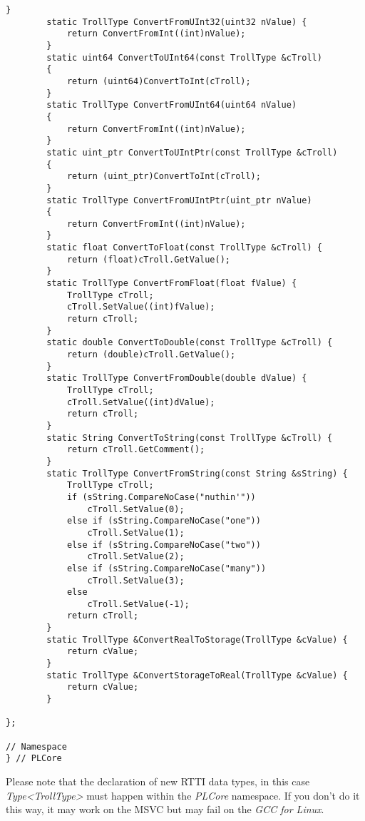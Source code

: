\begin{lstlisting}[label=Code:UserDefinedRTTIDataTypeInline,caption={Inline of the user defined \ac{RTTI} data type}]
		}
		static TrollType ConvertFromUInt32(uint32 nValue) {
			return ConvertFromInt((int)nValue);
		}
		static uint64 ConvertToUInt64(const TrollType &cTroll)
		{
			return (uint64)ConvertToInt(cTroll);
		}
		static TrollType ConvertFromUInt64(uint64 nValue)
		{
			return ConvertFromInt((int)nValue);
		}
		static uint_ptr ConvertToUIntPtr(const TrollType &cTroll)
		{
			return (uint_ptr)ConvertToInt(cTroll);
		}
		static TrollType ConvertFromUIntPtr(uint_ptr nValue)
		{
			return ConvertFromInt((int)nValue);
		}
		static float ConvertToFloat(const TrollType &cTroll) {
			return (float)cTroll.GetValue();
		}
		static TrollType ConvertFromFloat(float fValue) {
			TrollType cTroll;
			cTroll.SetValue((int)fValue);
			return cTroll;
		}
		static double ConvertToDouble(const TrollType &cTroll) {
			return (double)cTroll.GetValue();
		}
		static TrollType ConvertFromDouble(double dValue) {
			TrollType cTroll;
			cTroll.SetValue((int)dValue);
			return cTroll;
		}
		static String ConvertToString(const TrollType &cTroll) {
			return cTroll.GetComment();
		}
		static TrollType ConvertFromString(const String &sString) {
			TrollType cTroll;
			if (sString.CompareNoCase("nuthin'"))
				cTroll.SetValue(0);
			else if (sString.CompareNoCase("one"))
				cTroll.SetValue(1);
			else if (sString.CompareNoCase("two"))
				cTroll.SetValue(2);
			else if (sString.CompareNoCase("many"))
				cTroll.SetValue(3);
			else
				cTroll.SetValue(-1);
			return cTroll;
		}
		static TrollType &ConvertRealToStorage(TrollType &cValue) {
			return cValue;
		}
		static TrollType &ConvertStorageToReal(TrollType &cValue) {
			return cValue;
		}

};

// Namespace
} // PLCore
\end{lstlisting}
Please note that the declaration of new \ac{RTTI} data types, in this case \emph{Type<TrollType>} must happen within the \emph{PLCore} namespace. If you don't do it this way, it may work on the \ac{MSVC} but may fail on the \emph{\ac{GCC} for Linux}.


